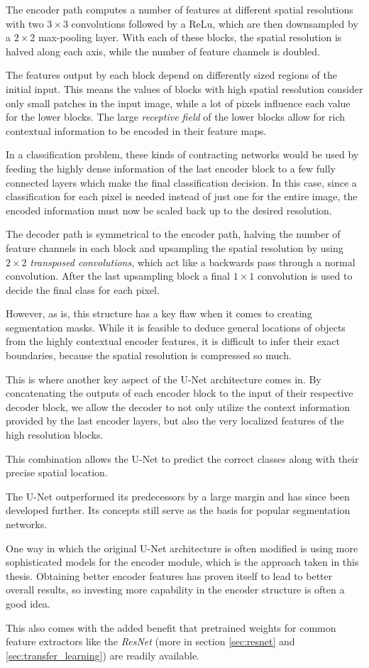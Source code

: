 The encoder path computes a number of features at different spatial resolutions with two $3\times 3$ convolutions followed by a ReLu, which are then downsampled by a $2\times 2$ max-pooling layer. 
With each of these blocks, the spatial resolution is halved along each axis, while the number of feature channels is doubled.

The features output by each block depend on differently sized regions of the initial input. 
This means the values of blocks with high spatial resolution consider only small patches in the input image, while a lot of pixels influence each value for the lower blocks. 
The large \emph{receptive field} of the lower blocks allow for rich contextual information to be encoded in their feature maps.

In a classification problem, these kinds of contracting networks would be used by feeding the highly dense information of the last encoder block to a few fully connected layers which make the final classification decision. 
In this case, since a classification for each pixel is needed instead of just one for the entire image, the encoded information must now be scaled back up to the desired resolution.

The decoder path is symmetrical to the encoder path, halving the number of feature channels in each block and upsampling the spatial resolution by using $2\times 2$ \emph{transposed convolutions}, which act like a backwards pass through a normal convolution.
After the last upsampling block a final $1\times 1$ convolution is used to decide the final class for each pixel.

However, as is, this structure has a key flaw when it comes to creating segmentation masks. While it is feasible to deduce general locations of objects from the highly contextual encoder features, it is difficult to infer their exact boundaries, because the spatial resolution is compressed so much. 

This is where another key aspect of the U-Net architecture comes in. 
By concatenating the outputs of each encoder block to the input of their respective decoder block, we allow the decoder to not only utilize the context information provided by the last encoder layers, but also the very localized features of the high resolution blocks.

This combination allows the U-Net to predict the correct classes along with their precise spatial location.

The U-Net outperformed its predecessors by a large margin and has since been developed further. Its concepts still serve as the basis for popular segmentation networks.

One way in which the original U-Net architecture is often modified is using more sophisticated models for the encoder module, which is the approach taken in this thesis. 
Obtaining better encoder features has proven itself to lead to better overall results, so investing more capability in the encoder structure is often a good idea. 

This also comes with the added benefit that pretrained weights for common feature extractors like the \emph{ResNet} (more in section \ref{sec:resnet} and \ref{sec:transfer_learning}) are readily available. 
